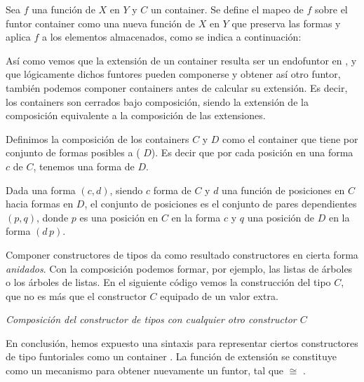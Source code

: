 \begin{definition} Sea $f$ una función de $X$ en $Y$ y $C$ un container. Se define el mapeo de $f$ sobre el funtor container  como una nueva función de  $X$ en  $Y$ que preserva las formas y aplica $f$ a los elementos almacenados, como se indica a continuación:

\end{definition}

Así como vemos que la extensión de un container resulta ser un endofuntor en , y que lógicamente dichos funtores pueden componerse y obtener así otro funtor, también podemos componer containers antes de calcular su extensión. Es decir, los containers son cerrados bajo composición, siendo la extensión de la composición equivalente a la composición de las extensiones.

\begin{definition} Definimos la composición de los containers $C$ y $D$ como el container que tiene por conjunto de formas posibles a  ( $D$). Es decir que por cada posición en una forma $c$ de $C$, tenemos una forma de $D$.

  Dada una forma $(c,d)$, siendo $c$ forma de $C$ y $d$ una función de posiciones en $C$ hacia formas en $D$, el conjunto de posiciones es el conjunto de pares dependientes $(p,q)$, donde $p$ es una posición en $C$ en la forma $c$ y $q$ una posición de $D$ en la forma $(d \, p)$.

\end{definition}

Componer constructores de tipos da como resultado constructores en cierta forma {\it anidados}. Con la composición podemos formar, por ejemplo, las listas de árboles o los árboles de listas. En el siguiente código vemos la construcción del tipo  $C$, que no es más que el constructor $C$ equipado de un valor extra. 

\begin{example} {\it Composición del constructor de tipos  con cualquier otro constructor $C$}
  
\end{example}

\vspace{3ex}

En conclusión, hemos expuesto una sintaxis para representar ciertos constructores de tipo funtoriales  \AgdaSymbol{:}  \AgdaSymbol{$\to$}  como un container
 \AgdaSymbol{:} .
La función de extensión se constituye como un mecanismo para obtener nuevamente un funtor, tal que  $\cong$
.

